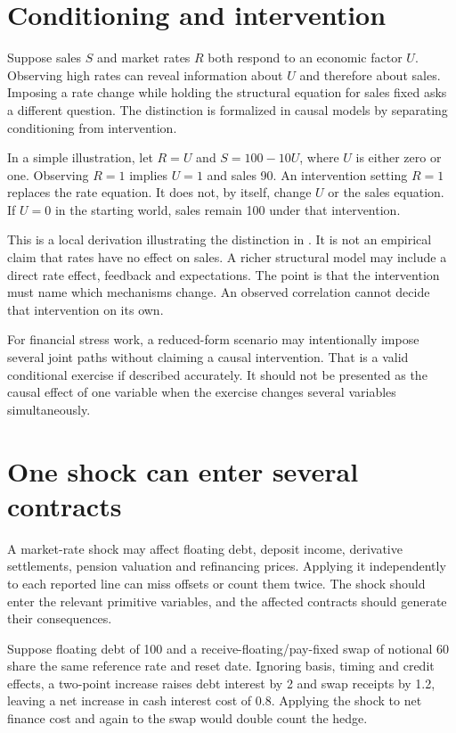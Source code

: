 \section{Conditioning and intervention}
Suppose sales $S$ and market rates $R$ both respond to an economic factor $U$. Observing high rates can reveal information about $U$ and therefore about sales. Imposing a rate change while holding the structural equation for sales fixed asks a different question. The distinction is formalized in causal models by separating conditioning from intervention.

In a simple illustration, let $R=U$ and $S=100-10U$, where $U$ is either zero or one. Observing $R=1$ implies $U=1$ and sales 90. An intervention setting $R=1$ replaces the rate equation. It does not, by itself, change $U$ or the sales equation. If $U=0$ in the starting world, sales remain 100 under that intervention.

This is a local derivation illustrating the distinction in \citet[Sections 3.2--3.4]{pearl2009}. It is not an empirical claim that rates have no effect on sales. A richer structural model may include a direct rate effect, feedback and expectations. The point is that the intervention must name which mechanisms change. An observed correlation cannot decide that intervention on its own.

For financial stress work, a reduced-form scenario may intentionally impose several joint paths without claiming a causal intervention. That is a valid conditional exercise if described accurately. It should not be presented as the causal effect of one variable when the exercise changes several variables simultaneously.

\section{One shock can enter several contracts}
A market-rate shock may affect floating debt, deposit income, derivative settlements, pension valuation and refinancing prices. Applying it independently to each reported line can miss offsets or count them twice. The shock should enter the relevant primitive variables, and the affected contracts should generate their consequences.

Suppose floating debt of 100 and a receive-floating/pay-fixed swap of notional 60 share the same reference rate and reset date. Ignoring basis, timing and credit effects, a two-point increase raises debt interest by 2 and swap receipts by 1.2, leaving a net increase in cash interest cost of 0.8. Applying the shock to net finance cost and again to the swap would double count the hedge.


